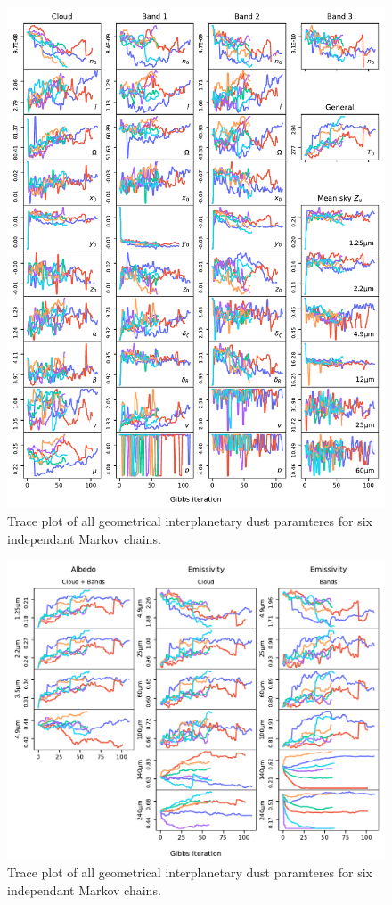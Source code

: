 \documentclass{aa}
\begin{document}
\begin{figure}
    \centering
    \includegraphics[width=1\textwidth]{figs/total_trace.pdf}
    \caption{Trace plot of all geometrical interplanetary dust paramteres for six independant Markov chains.}
    \label{fig:trace-ipd}
\end{figure}

\begin{figure}
    \centering
    \includegraphics[width=1\textwidth]{figs/emissivity_and_albedo_trace.pdf}
    \caption{Trace plot of all geometrical interplanetary dust paramteres for six independant Markov chains.}
    \label{fig:trace-emissivity-albedo}
\end{figure}
\end{document}
